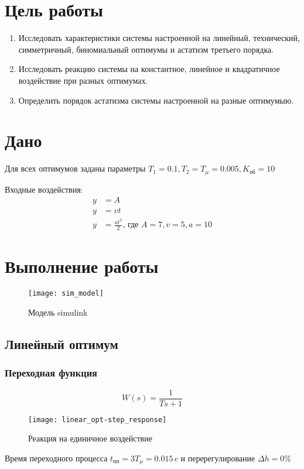 


	
	\section{Цель работы}
		\begin{enumerate}
			\item Исследовать характеристики системы настроенной на линейный, технический, симметричный, биномиальный оптимумы и астатизм третьего порядка.
			\item Исследовать реакцию системы на константное, линейное и квадратичное воздействие при разных оптимумах.
            \item Определить порядок астатизма системы настроенной на разные оптимумыю.
		\end{enumerate}
	\section{Дано}
		Для всех оптимумов заданы параметры $T_1=0.1, T_2=T_{\mu}=0.005, K_{\text{об}}=10$
		
		Входные воздействия:
		\begin{align*}
			  y &= A\\
			  y &= vt\\
			  y &= \frac{at^2}{2}\mbox{, где } A = 7, v=5, a=10
		\end{align*}
	\section{Выполнение работы}
		\begin{figure}[H]
			\centering
			\texttt{[image: sim\_model]}
			\caption{Модель simulink}
		\end{figure}
		\newpage
		\subsection{Линейный оптимум}
			\subsubsection{Переходная функция}
				$$W(s)=\frac{1}{Ts+1}$$
				\begin{figure}[H]
					\centering
					\texttt{[image: linear\_opt-step\_response]}
					\caption{Реакция на единичное воздействие}
				\end{figure}
				Время переходного процесса $t_{\text{пп}}=3T_{\mu}=0.015\,c$ и перерегулирование $\Delta h=0\%$
